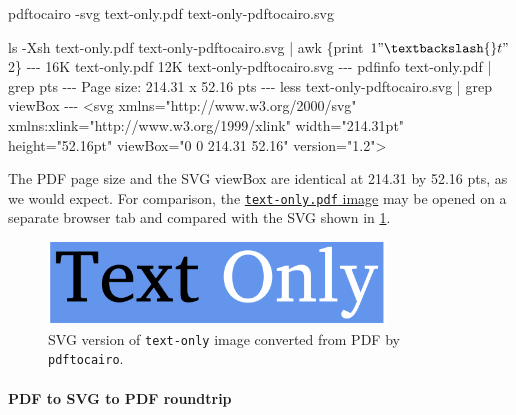 \documentclass[
  11pt,
  british,
  a4paper,
]{article}
\newenvironment{Shaded}{\begin{snugshade}}{\end{snugshade}}
\newcommand{\AttributeTok}[1]{\textcolor[rgb]{0.80,0.80,0.80}{#1}}
\newcommand{\ExtensionTok}[1]{\textcolor[rgb]{0.80,0.80,0.80}{#1}}
\newcommand{\FunctionTok}[1]{\textcolor[rgb]{0.94,0.94,0.56}{#1}}
\newcommand{\KeywordTok}[1]{\textcolor[rgb]{0.94,0.87,0.69}{#1}}
\newcommand{\NormalTok}[1]{\textcolor[rgb]{0.80,0.80,0.80}{#1}}
\newcommand{\OperatorTok}[1]{\textcolor[rgb]{0.94,0.94,0.82}{#1}}
\newcommand{\StringTok}[1]{\textcolor[rgb]{0.80,0.58,0.58}{#1}}
\newcommand{\VariableTok}[1]{\textcolor[rgb]{0.80,0.80,0.80}{#1}}
\begin{document}
\begin{Shaded}
\begin{Highlighting}[]
\ExtensionTok{pdftocairo} \AttributeTok{{-}svg}\NormalTok{ text{-}only.pdf text{-}only{-}pdftocairo.svg}

\FunctionTok{ls} \AttributeTok{{-}Xsh}\NormalTok{ text{-}only.pdf text{-}only{-}pdftocairo.svg }\KeywordTok{|} \FunctionTok{awk} \StringTok{\textquotesingle{}\{print $1 "\textbackslash{}t" $2\}\textquotesingle{}}
\ExtensionTok{{-}{-}{-}}
\ExtensionTok{16K}\NormalTok{     text{-}only.pdf}
\ExtensionTok{12K}\NormalTok{     text{-}only{-}pdftocairo.svg}
\ExtensionTok{{-}{-}{-}}
\ExtensionTok{pdfinfo}\NormalTok{ text{-}only.pdf }\KeywordTok{|} \FunctionTok{grep}\NormalTok{ pts}
\ExtensionTok{{-}{-}{-}}
\ExtensionTok{Page}\NormalTok{ size:      214.31 x 52.16 pts}
\ExtensionTok{{-}{-}{-}}
\FunctionTok{less}\NormalTok{ text{-}only{-}pdftocairo.svg }\KeywordTok{|} \FunctionTok{grep}\NormalTok{ viewBox}
\ExtensionTok{{-}{-}{-}}
\OperatorTok{\textless{}}\NormalTok{svg }\VariableTok{xmlns}\OperatorTok{=}\StringTok{"http://www.w3.org/2000/svg"} \ExtensionTok{xmlns:xlink=}\StringTok{"http://www.w3.org/1999/xlink"}\NormalTok{ width=}\StringTok{"214.31pt"}\NormalTok{ height=}\StringTok{"52.16pt"}\NormalTok{ viewBox=}\StringTok{"0 0 214.31 52.16"}\NormalTok{ version=}\StringTok{"1.2"}\OperatorTok{\textgreater{}}
\end{Highlighting}
\end{Shaded}

The PDF page size and the SVG viewBox are identical at 214.31 by 52.16
pts, as we would expect. For comparison, the
\href{images/text-only.pdf}{\texttt{text-only.pdf} image} may be opened
on a separate browser tab and compared with the SVG shown in
\cref{fig:SVGfromPDFviapdftocairo}.

\begin{figure}
\hypertarget{fig:SVGfromPDFviapdftocairo}{%
\centering
\includegraphics[width=0.8\textwidth,height=\textheight]{images/text-only-pdftocairo.svg}
\caption{SVG version of \texttt{text-only} image converted from PDF by
\texttt{pdftocairo}.}\label{fig:SVGfromPDFviapdftocairo}
}
\end{figure}

\hypertarget{pdf-to-svg-to-pdf-roundtrip}{%
\paragraph{PDF to SVG to PDF
roundtrip}\label{pdf-to-svg-to-pdf-roundtrip}}
\end{document}
